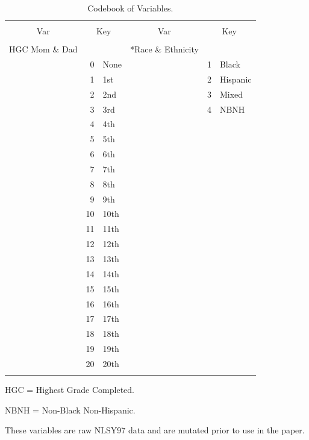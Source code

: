 \documentclass[jou,12pt,floatsintext]{apa7}
\begin{document}
\begin{table}[h] \centering
  \begin{threeparttable}
    \caption{Codebook of Variables.}
    \label{Tab:CODE}
    \small
    \setlength{\tabcolsep}{4pt}
    \begin{tabular*}{\columnwidth}{@{\extracolsep{\fill}}crlcrl@{}}
      \toprule \\[-1.8ex]
      Var & \multicolumn{2}{c}{Key} & Var & \multicolumn{2}{c}{Key} \\
      \midrule \\[-1.8ex]
      HGC Mom \& Dad  & & &*Race \& Ethnicity & & \\
      & 0 & None &  & 1 & Black \\
      & 1 & 1st & & 2 & Hispanic \\
      & 2 & 2nd & & 3 & Mixed \\
      & 3 & 3rd & & 4 & NBNH \\
      & 4 & 4th & & & \\
      & 5 & 5th & & & \\
      & 6 & 6th & & & \\
      & 7 & 7th & & & \\
      & 8 & 8th & & & \\
      & 9 & 9th & & & \\
      & 10 & 10th & & & \\
      & 11 & 11th & & & \\
      & 12 & 12th & & & \\
      & 13 & 13th & & & \\
      & 14 & 14th & & & \\
      & 15 & 15th & & & \\
      & 16 & 16th & & & \\
      & 17 & 17th & & & \\
      & 18 & 18th & & & \\
      & 19 & 19th & & & \\
      & 20 & 20th & & & \\
      \bottomrule \\[-1.8ex]
    \end{tabular*}
    \normalsize
    \begin{tablenotes}
      \item HGC = Highest Grade Completed.
      \item NBNH = Non-Black Non-Hispanic.
      \item *These variables are raw NLSY97 data and are mutated prior to use in the paper.
    \end{tablenotes}
  \end{threeparttable}
\end{table}
\end{document}
